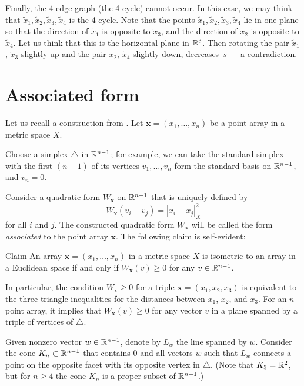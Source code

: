 \documentclass{article}
\begin{document}
Finally, the 4-edge graph (the 4-cycle) cannot occur.
In this case, we may think that $\tilde x_1,\tilde x_2,\tilde x_3,\tilde x_4$ is the 4-cycle.
Note that the points $\tilde x_1,\tilde x_2,\tilde x_3,\tilde x_4$  lie in one plane so that the direction of $\tilde x_1$ is opposite to $\tilde x_3$,
and the direction of $\tilde x_2$ is opposite to $\tilde x_4$.
Let us think that this is the horizontal plane in $\mathbb{R}^3$.
Then rotating the pair $\tilde x_1$, $\tilde x_3$ slightly up and 
the pair $\tilde x_2$, $\tilde x_4$  slightly down, decreases~$s$ --- a contradiction.
\qeds

\section{Associated form}

Let us recall a construction from \cite{petrunin-2017}.
Let $\bm{x}=(x_1,\dots,x_n)$ be a point array in a metric space $X$.

Choose a simplex $\triangle$ in $\mathbb{R}^{n-1}$; for example, we can take the standard simplex with the first $(n-1)$ of its vertices $v_1,\dots,v_n$ form the standard basis on $\mathbb{R}^{n-1}$, and $v_n=0$.

Consider a quadratic form $W_{\bm{x}}$ on $\mathbb{R}^{n-1}$ that is uniquely defined by
\[W_{\bm{x}}(v_i-v_j)=|x_i-x_j|^2_X\] 
for all $i$ and $j$.
The constructed quadratic form $W_{\bm{x}}$ will be called
the form \emph{associated} to the point array $\bm{x}$.
The following claim is self-evident:

\begin{thm}{Claim}\label{clm:W>=0}
An array $\bm{x}=(x_1,\dots,x_n)$ in a metric space $X$ is isometric to an array in a Euclidean space if and only if 
$W_{\bm{x}}(v)\ge 0$
for any $v\in \mathbb{R}^{n-1}$.
\end{thm}


In particular, the condition $W_{\bm{x}}\ge 0$ for a triple $\bm{x}=(x_1,x_2,x_3)$ is equivalent to 
the three triangle inequalities for the distances between $x_1$, $x_2$, and $x_3$.
For an $n$-point array, it implies that $W_{\bm{x}}(v)\ge 0$ for any vector $v$ in a plane spanned by a triple of vertices of $\triangle$.

Given nonzero vector $w\in\mathbb{R}^{n-1}$, denote by $L_w$ the line spanned by $w$.
Consider the cone $K_n\subset \mathbb{R}^{n-1}$ that contains $0$ and all vectors $w$ such that $L_w$ connects a point on the opposite facet with its opposite vertex in $\triangle$.
(Note that $K_3=\mathbb{R}^2$, but for $n\ge 4$ the cone $K_n$ is a proper subset of $\mathbb{R}^{n-1}$.)
\end{document}
